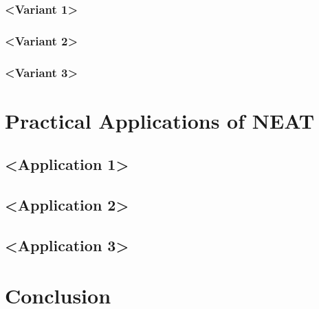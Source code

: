 \documentclass[journal, a4paper]{IEEEtran}
\begin{document}
\subsubsection{<Variant 1>}
\subsubsection{<Variant 2>}
\subsubsection{<Variant 3>}




\section{Practical Applications of NEAT}

\subsection{<Application 1>}
\subsection{<Application 2>}
\subsection{<Application 3>}





\section{Conclusion}

\blindtext



\end{document}
